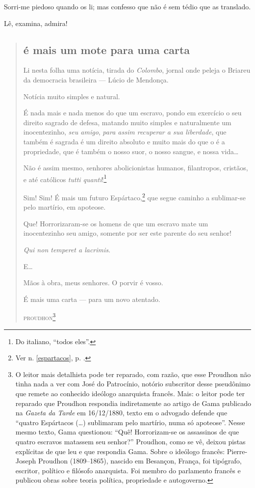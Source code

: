 Sorri-me piedoso quando os li; mas confesso que não é sem tédio que as
translado.

Lê, examina, admira!

\begin{quote}
\subsection{é mais um mote para uma carta}

Li nesta folha uma notícia, tirada do \emph{Colombo}, jornal onde peleja 
o Briareu da democracia brasileira --- Lúcio de Mendonça.

Notícia muito simples e natural.

É nada mais e nada menos do que um escravo, pondo em exercício o seu
direito sagrado de defesa, matando muito simples e naturalmente um
inocentezinho, \emph{seu amigo}, \emph{para assim recuperar a sua
liberdade}, que também é sagrada é um direito absoluto e muito mais do
que o é a propriedade, que é também o nosso suor, o nosso sangue, e
nossa vida\ldots{}

Não é assim mesmo, senhores abolicionistas humanos, filantropos,
cristãos, e até católicos \emph{tutti quanti}!\footnote{Do italiano,
  ``todos eles''.}

\noindent\dotfill{}

Sim! Sim! É mais um futuro Espártaco,\footnote{Ver n. \ref{espartacos}, p. \pageref{espartacos}.} que segue caminho a sublimar-se pelo martírio, em
apoteose.

Que! Horrorizaram-se os homens de que um escravo mate um inocentezinho
seu amigo, somente por ser este parente do seu senhor!

\emph{Qui non temperet a lacrimis}.

E\ldots{}

Mãos à obra, meus senhores. O porvir é vosso.

É mais uma carta --- para um novo atentado.

\hfill\textsc{proudhon}\footnote{O leitor mais detalhista pode ter reparado, com razão, que esse Proudhon não tinha nada a ver com José do
  Patrocínio, notório subscritor desse pseudônimo que remete ao
  conhecido ideólogo anarquista francês. Mais: o leitor pode ter
  reparado que Proudhon respondia indiretamente ao artigo de Gama
  publicado na \emph{Gazeta da Tarde} em 16/12/1880, texto em o advogado
  defende que ``quatro Espártacos (\ldots{}) sublimaram pelo martírio, numa só
  apoteose''. Nesse mesmo texto, Gama questionou: ``Quê! Horrorizam-se os
  assassinos de que quatro escravos matassem seu senhor?''
  Proudhon, como se vê, deixou pistas explícitas de que leu e que
  respondia Gama. Sobre o ideólogo francês: Pierre-Joseph Proudhon \label{proudhon}
  (1809--1865), nascido em Besançon, França, foi tipógrafo, escritor,
  político e filósofo anarquista. Foi membro do parlamento francês e
  publicou obras sobre teoria política, propriedade e autogoverno.}
\end{quote}

